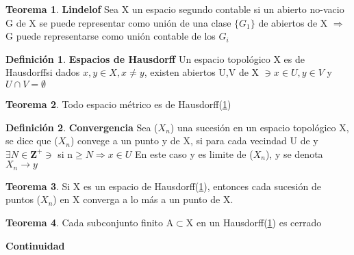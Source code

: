 \documentclass{article}
\theoremstyle{definition}
\newtheorem{definition}{Definición}[section]
\newtheorem{theorem}{Teorema}[section]
\begin{document}
\begin{theorem}{\textbf{Lindelof}}
	Sea X un espacio segundo contable si un abierto no-vacio G de X se puede representar como unión de una clase $\{G_1\}$ de abiertos de X $\Rightarrow$ G puede representarse como unión contable de los $G_i$
\end{theorem}
\begin{definition}{\textbf{Espacios de Hausdorff}}
	Un espacio topológico X es de Hausdorff\label{Hausdorff} si dados $x,y\in X, x\neq y$, existen abiertos U,V de X $\ni x\in U,y\in V$ y $U\cap V = \emptyset$
\end{definition}
\begin{theorem}
	Todo espacio métrico es de Hausdorff(\ref{Hausdorff})
\end{theorem}
\begin{definition}{\textbf{Convergencia}}
	Sea ($X_n$) una sucesión en un espacio topológico X, se dice que ($X_n$) convege a un punto y de X, si para cada vecindad U de y $\exists N\in \mathbf{Z}^+\ni$ si n$\geq N\Rightarrow x\in U$ En este caso y es limite de ($X_n$), y se denota $X_n\to y$
\end{definition}	
\begin{theorem}
	Si X es un espacio de Hausdorff(\ref{Hausdorff}), entonces cada sucesión de puntos ($X_n$) en X converga a lo más a un punto de X.
\end{theorem}
\begin{theorem}
	Cada subconjunto finito A$\subset$X en un Hausdorff(\ref{Hausdorff}) es cerrado
\end{theorem}


\textbf{Continuidad}
\end{document}
